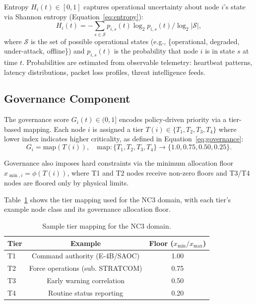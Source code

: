 \documentclass[runningheads]{llncs}
\begin{document}
Entropy $H_i(t) \in [0,1]$ captures operational uncertainty about node $i$'s state via Shannon entropy (Equation~\ref{eq:entropy}):
\begin{equation}
H_i(t) = -\sum_{s \in \mathcal{S}} p_{i,s}(t) \log_2 p_{i,s}(t) / \log_2 |\mathcal{S}|,
\label{eq:entropy}
\end{equation}
where $\mathcal{S}$ is the set of possible operational states (e.g., \{operational, degraded, under-attack, offline\}) and $p_{i,s}(t)$ is the probability that node $i$ is in state $s$ at time $t$. Probabilities are estimated from observable telemetry: heartbeat patterns, latency distributions, packet loss profiles, threat intelligence feeds.

\subsection{Governance Component}

The governance score $G_i(t) \in (0, 1]$ encodes policy-driven priority via a tier-based mapping. Each node $i$ is assigned a tier $T(i) \in \{T_1, T_2, T_3, T_4\}$ where lower index indicates higher criticality, as defined in Equation~\ref{eq:governance}:
\begin{equation}
G_i = \text{map}(T(i)), \quad \text{map}: \{T_1, T_2, T_3, T_4\} \to \{1.0, 0.75, 0.50, 0.25\}.
\label{eq:governance}
\end{equation}

Governance also imposes hard constraints via the minimum allocation floor $x_{\min,i} = \phi(T(i))$, where T1 and T2 nodes receive non-zero floors and T3/T4 nodes are floored only by physical limits.

Table~\ref{tab:tier_nc3} shows the tier mapping used for the NC3 domain, with each tier's example node class and its governance allocation floor.

\begin{table}[ht]
\caption{Sample tier mapping for the NC3 domain.}
\label{tab:tier_nc3}
\centering
\small
\begin{tabular}{lcc}
\toprule
Tier & Example & Floor ($x_{\min}/x_{\max}$) \\
\midrule
T1 & Command authority (E-4B/SAOC) & 1.00 \\
T2 & Force operations (sub. STRATCOM) & 0.75 \\
T3 & Early warning correlation & 0.50 \\
T4 & Routine status reporting & 0.20 \\
\bottomrule
\end{tabular}
\end{table}
\end{document}

